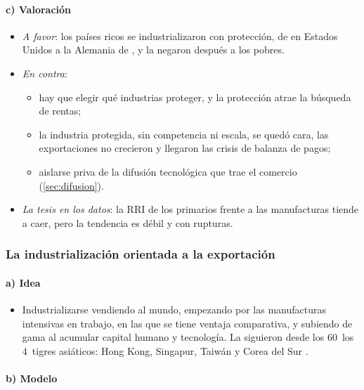 \documentclass[11pt]{article}
\begin{document}
\paragraph{c) Valoración}

\begin{itemize}
\item \emph{A favor}: los países ricos se industrializaron con protección, de \textcite{Hamilton1791Report} en Estados Unidos a la Alemania de \textcite{List1841System}, y la negaron después a los pobres\nocite{Chang2002}.
\item \emph{En contra}:
  \begin{itemize}
  \item hay que elegir qué industrias proteger, y la protección atrae la búsqueda de rentas\nocite{Krueger1974Political};
  \item la industria protegida, sin competencia ni escala, se quedó cara, las exportaciones no crecieron y llegaron las crisis de balanza de pagos;
  \item aislarse priva de la difusión tecnológica que trae el comercio (\ref{sec:difusion}).
  \end{itemize}
\item \emph{La tesis en los datos}: la RRI de los primarios frente a las manufacturas tiende a caer, pero la tendencia es débil y con rupturas\nocite{HarveyEtAl2010Prebisch}.
\end{itemize}

\subsubsection{La industrialización orientada a la exportación}\label{sec:ioe}

\paragraph{a) Idea}

\begin{itemize}
\item Industrializarse vendiendo al mundo, empezando por las manufacturas intensivas en trabajo, en las que se tiene ventaja comparativa, y subiendo de gama al acumular capital humano y tecnología. La siguieron desde los 60~los 4~tigres asiáticos: Hong Kong, Singapur, Taiwán y Corea del Sur .
\end{itemize}

\paragraph{b) Modelo}
\end{document}
